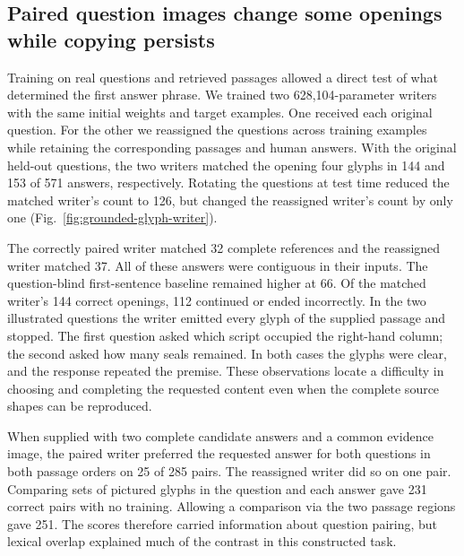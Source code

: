 \subsection*{Paired question images change some openings while copying persists}
Training on real questions and retrieved passages allowed a direct test of what determined the first answer phrase. We trained two 628,104-parameter writers with the same initial weights and target examples. One received each original question. For the other we reassigned the questions across training examples while retaining the corresponding passages and human answers. With the original held-out questions, the two writers matched the opening four glyphs in 144 and 153 of 571 answers, respectively. Rotating the questions at test time reduced the matched writer's count to 126, but changed the reassigned writer's count by only one (Fig.~\ref{fig:grounded-glyph-writer}).

The correctly paired writer matched 32 complete references and the reassigned writer matched 37. All of these answers were contiguous in their inputs. The question-blind first-sentence baseline remained higher at 66. Of the matched writer's 144 correct openings, 112 continued or ended incorrectly. In the two illustrated questions the writer emitted every glyph of the supplied passage and stopped. The first question asked which script occupied the right-hand column; the second asked how many seals remained. In both cases the glyphs were clear, and the response repeated the premise. These observations locate a difficulty in choosing and completing the requested content even when the complete source shapes can be reproduced.

When supplied with two complete candidate answers and a common evidence image, the paired writer preferred the requested answer for both questions in both passage orders on 25 of 285 pairs. The reassigned writer did so on one pair. Comparing sets of pictured glyphs in the question and each answer gave 231 correct pairs with no training. Allowing a comparison via the two passage regions gave 251. The scores therefore carried information about question pairing, but lexical overlap explained much of the contrast in this constructed task.
